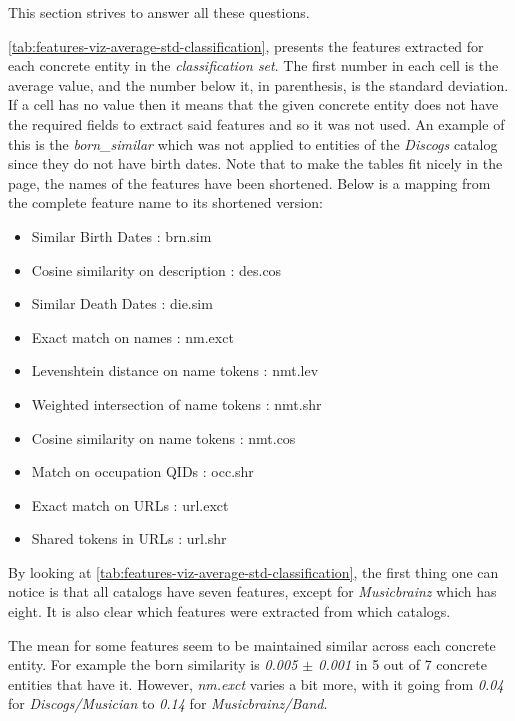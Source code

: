 \documentclass[epsfig,a4paper,11pt,titlepage,twoside,openany]{book}
\begin{document}
This section strives to answer all these questions.

\autoref{tab:features-viz-average-std-classification}, presents the features extracted for each concrete entity in the \textit{classification set}. The first number in each cell is the average value, and the number below it, in parenthesis, is the standard deviation. If a cell has no value then it means that the given concrete entity does not have the required fields to extract said features and so it was not used. An example of this is the \textit{born\_similar} which was not applied to entities of the \textit{Discogs} catalog since they do not have birth dates. Note that to make the tables fit nicely in the page, the names of the features have been shortened. Below is a mapping from the complete feature name to its shortened version:

\begin{itemize}
    \item Similar Birth Dates : brn.sim
    \item Cosine similarity on description : des.cos
    \item Similar Death Dates : die.sim
    \item Exact match on names : nm.exct
    \item Levenshtein distance on name tokens : nmt.lev 
    \item Weighted intersection of name tokens : nmt.shr
    \item Cosine similarity on name tokens : nmt.cos
    \item Match on occupation QIDs : occ.shr
    \item Exact match on URLs : url.exct
    \item Shared tokens in URLs : url.shr 
\end{itemize}

By looking at \autoref{tab:features-viz-average-std-classification}, the first thing one can notice is that all catalogs have seven features, except for \textit{Musicbrainz} which has eight. It is also clear which features were extracted from which catalogs. 

The mean for some features seem to be maintained similar across each concrete entity. For example the born similarity is \textit{0.005 $\pm$ 0.001} in 5 out of 7 concrete entities that have it. However, \textit{nm.exct} varies a bit more, with it going from \textit{0.04} for \textit{Discogs/Musician} to \textit{0.14} for \textit{Musicbrainz/Band}. 

\end{document}
